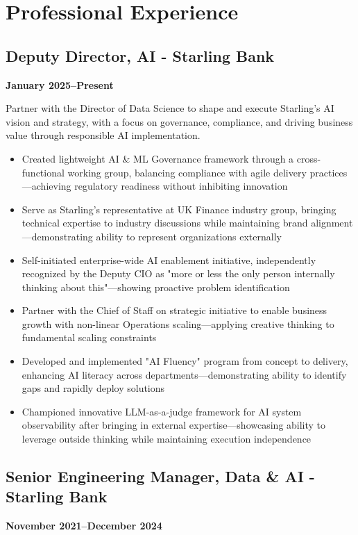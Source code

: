 \documentclass[a4paper]{scrartcl}
\begin{document}
\section*{Professional Experience}

\subsection*{Deputy Director, AI - Starling Bank}
\textbf{January 2025--Present}

Partner with the Director of Data Science to shape and execute Starling's AI vision and strategy, with a focus on governance, compliance, and driving business value through responsible AI implementation.
\begin{itemize}
	\item Created lightweight AI \& ML Governance framework through a cross-functional working group, balancing compliance with agile delivery practices—achieving regulatory readiness without inhibiting innovation
	\item Serve as Starling's representative at UK Finance industry group, bringing technical expertise to industry discussions while maintaining brand alignment—demonstrating ability to represent organizations externally
	\item Self-initiated enterprise-wide AI enablement initiative, independently recognized by the Deputy CIO as "more or less the only person internally thinking about this"—showing proactive problem identification
	\item Partner with the Chief of Staff on strategic initiative to enable business growth with non-linear Operations scaling—applying creative thinking to fundamental scaling constraints
	\item Developed and implemented "AI Fluency" program from concept to delivery, enhancing AI literacy across departments—demonstrating ability to identify gaps and rapidly deploy solutions
	\item Championed innovative LLM-as-a-judge framework for AI system observability after bringing in external expertise—showcasing ability to leverage outside thinking while maintaining execution independence
\end{itemize}

\subsection*{Senior Engineering Manager, Data \& AI - Starling Bank}
\textbf{November 2021--December 2024}
\end{document}
